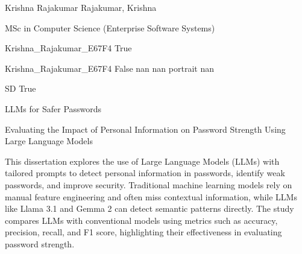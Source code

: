 
\begingroup{}\relax



\def\Key{Krishna_Rajakumar_E67F4}

{Krishna Rajakumar}
{Rajakumar, Krishna}

{MSc in Computer Science (Enterprise Software Systems)}

{Krishna_Rajakumar_E67F4}
{True}

{Krishna_Rajakumar_E67F4}
{False}
{nan}
{nan}
{portrait}
{nan}

{SD}
{True}

{LLMs for Safer Passwords}

{Evaluating the Impact of Personal Information on Password Strength Using Large Language Models}

{This dissertation explores the use of Large Language Models (LLMs) with tailored prompts to detect personal information in passwords, identify weak passwords, and improve security. Traditional machine learning models rely on manual feature engineering and often miss contextual information, while LLMs like Llama 3.1 and Gemma 2 can detect semantic patterns directly. The study compares LLMs with conventional models using metrics such as accuracy, precision, recall, and F1 score, highlighting their effectiveness in evaluating password strength.}

